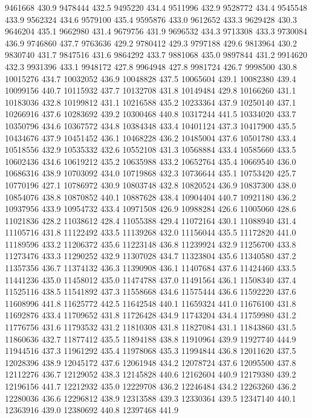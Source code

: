 9461668 430.9
9478444 432.5
9495220 434.4
9511996 432.9
9528772 434.4
9545548 433.9
9562324 434.6
9579100 435.4
9595876 433.0
9612652 433.3
9629428 430.3
9646204 435.1
9662980 431.4
9679756 431.9
9696532 434.3
9713308 433.3
9730084 436.9
9746860 437.7
9763636 429.2
9780412 429.3
9797188 429.6
9813964 430.2
9830740 431.7
9847516 431.6
9864292 433.7
9881068 435.0
9897844 431.2
9914620 432.3
9931396 433.1
9948172 427.8
9964948 427.8
9981724 426.7
9998500 430.8
10015276 434.7
10032052 436.9
10048828 437.5
10065604 439.1
10082380 439.4
10099156 440.7
10115932 437.7
10132708 431.8
10149484 429.8
10166260 431.1
10183036 432.8
10199812 431.1
10216588 435.2
10233364 437.9
10250140 437.1
10266916 437.6
10283692 439.2
10300468 440.8
10317244 441.5
10334020 433.7
10350796 434.6
10367572 434.8
10384348 433.4
10401124 437.3
10417900 435.5
10434676 437.9
10451452 436.1
10468228 436.2
10485004 437.6
10501780 433.4
10518556 432.9
10535332 432.6
10552108 431.3
10568884 433.4
10585660 433.5
10602436 434.6
10619212 435.2
10635988 433.2
10652764 435.4
10669540 436.0
10686316 438.9
10703092 434.0
10719868 432.3
10736644 435.1
10753420 425.7
10770196 427.1
10786972 430.9
10803748 432.8
10820524 436.9
10837300 438.0
10854076 438.8
10870852 440.1
10887628 438.4
10904404 440.7
10921180 436.2
10937956 433.9
10954732 433.4
10971508 426.9
10988284 426.6
11005060 428.6
11021836 428.2
11038612 428.4
11055388 429.4
11072164 430.1
11088940 431.4
11105716 431.8
11122492 433.5
11139268 432.0
11156044 435.5
11172820 441.0
11189596 433.2
11206372 435.6
11223148 436.8
11239924 432.9
11256700 433.8
11273476 433.3
11290252 432.9
11307028 434.7
11323804 435.6
11340580 437.2
11357356 436.7
11374132 436.3
11390908 436.1
11407684 437.6
11424460 433.5
11441236 435.0
11458012 435.0
11474788 437.0
11491564 436.1
11508340 437.4
11525116 438.5
11541892 437.3
11558668 434.6
11575444 436.6
11592220 437.6
11608996 441.8
11625772 442.5
11642548 440.1
11659324 441.0
11676100 431.8
11692876 433.4
11709652 431.8
11726428 434.9
11743204 434.4
11759980 431.2
11776756 431.6
11793532 431.2
11810308 431.8
11827084 431.1
11843860 431.5
11860636 432.7
11877412 435.5
11894188 438.8
11910964 439.9
11927740 444.9
11944516 437.3
11961292 435.4
11978068 435.3
11994844 436.8
12011620 437.5
12028396 438.9
12045172 437.6
12061948 434.2
12078724 437.6
12095500 437.8
12112276 436.7
12129052 438.3
12145828 440.6
12162604 440.9
12179380 439.2
12196156 441.7
12212932 435.0
12229708 436.2
12246484 434.2
12263260 436.2
12280036 436.6
12296812 438.9
12313588 439.3
12330364 439.5
12347140 440.1
12363916 439.0
12380692 440.8
12397468 441.9

